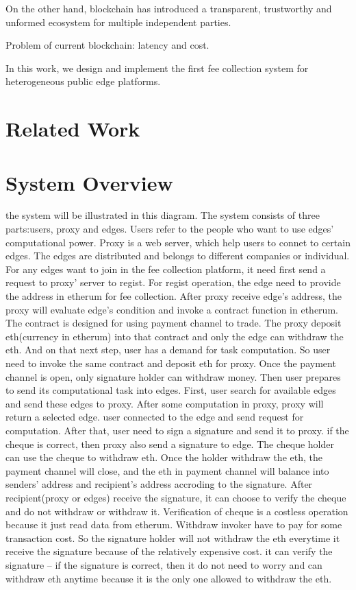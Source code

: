 \documentclass[10pt, conference, letterpaper]{IEEEtran}
\begin{document}
On the other hand, blockchain has introduced a transparent, trustworthy and unformed ecosystem for multiple independent parties. \cite{WeiCaiWEHFL2018}

Problem of current blockchain: latency and cost.

In this work, we design and implement the first fee collection system for heterogeneous public edge platforms.


\section{Related Work}

\section{System Overview}
the system will be illustrated in this diagram. The system consists of three parts:users, proxy and edges. Users refer to the people who want to use edges' computational power. Proxy is a web server, which help users to connet to certain edges. The edges are distributed and belongs to different companies or individual. For any edges want to join in the fee collection platform, it need first send a request to proxy' server to regist. For regist operation, the edge need to provide the address in etherum for fee collection. After proxy receive edge's address, the proxy will evaluate edge's condition and invoke a contract function in etherum. The contract is designed for using payment channel to trade. The proxy deposit eth(currency in etherum) into that contract and only the edge can withdraw the eth. And on that next step, user has a demand for task computation. So user need to invoke the same contract and deposit eth for proxy. Once the payment channel is open, only signature holder can withdraw money. Then user prepares to send its computational task into edges. First, user search for available edges and send these edges to proxy. After some computation in proxy, proxy will return a selected edge. user connected to the edge and send request for computation. After that, user need to sign a signature and send it to proxy. if the cheque is correct, then proxy also send a signature to edge. The cheque holder can use the cheque to withdraw eth. Once the holder withdraw the eth, the payment channel will close, and the eth in payment channel will balance into senders' address and recipient's address accroding to the signature. After recipient(proxy or edges) receive the signature, it can choose to verify the cheque and do not withdraw or withdraw it. Verification of cheque is a costless operation because it just read data from etherum. Withdraw invoker have to pay for some transaction cost. So the signature holder will not withdraw the eth everytime it receive the signature because of the relatively expensive cost. it can verify the signature -- if the signature is correct, then it do not need to worry and can withdraw eth anytime because it is the only one allowed to withdraw the eth. 
\end{document}
